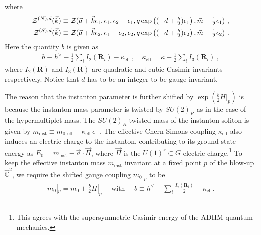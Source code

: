 \documentclass[letterpaper, 11pt]{article}
\def\IC{\mathbb{C}}
\def\IP{\mathbb{P}}
\def\CO{{\cal O}}
\def\CZ{{\cal Z}}
\def\e{\epsilon}
\def\k{\kappa}
\def\half{\frac{1}{2}}
\begin{document}
where
\begin{align}
  \label{eq:param-np-sp5d}
\begin{split}
  \CZ^{(N),d}(\vec{k}) &\equiv \CZ(\vec{a}+\vec{k} \e_1, \e_1, \e_2-\e_1, q \exp \left((-d + \tfrac{b}{2})\e_1 \right), \vec{m} -\tfrac{1}{2}\e_1) \ , \\
  \CZ^{(S),d}(\vec{k}) &\equiv \CZ(\vec{a}+\vec{k} \e_2, \e_1 - \e_2, \e_2, q \exp \left( (-d + \tfrac{b}{2})\e_2\right), \vec{m} -\tfrac{1}{2}\e_2)\ . 
\end{split}
\end{align}
Here the quantity $b$ is given as 
\begin{align}
 b \equiv h^\vee - \frac{1}{2} \sum_i I_2(\mathbf{R}_i) - \kappa_{\textrm{eff}} \ , \quad \kappa_{\textrm{eff}} = \kappa - \half \sum_i I_3(\mathbf{R}_i) \ , 
\end{align}
where $I_2(\mathbf{R})$ and $I_3(\mathbf{R})$ are quadratic and cubic Casimir invariants respectively. 
Notice that $d$ has to be an integer to be gauge-invariant. 

The reason that the instanton parameter is further shifted by $\exp(\frac{b}{2} H|_p) $ is because the instanton mass parameter is twisted by $SU(2)_R$ as in the case of the hypermultiplet mass. The $SU(2)_R$ twisted mass of the instanton soliton is given by $m_\text{inst} \equiv m_{0, \textrm{eff}} - \kappa_\text{eff}\,\e_+$. The  effective Chern-Simons coupling $\k_{\textrm{eff}}$ also induces an electric charge to the instanton, contributing to its ground state energy as $E_0 = m_\text{inst} - \vec{a} \cdot \vec{\Pi}$, where $\vec{\Pi}$ is the $U(1)^r \subset G$ electric charge.\footnote{This agrees with the supersymmetric Casimir energy of the ADHM quantum mechanics.} To keep the effective instanton mass $m_\text{inst}$ invariant at a fixed point $p$ of the blow-up $\hat{\IC}^2$, we require the shifted gauge coupling $m_0|_p$  to be 
\begin{align}
  \label{eq:coupling-shift}
  m_0|_p = m_0 + \frac{b}{2}H|_p \quad \text{ with }\quad
  b \equiv h^{\vee}-\sum_i\frac{I_2(\boldsymbol{R}_i)}{2} - \kappa_\text{eff}.
\end{align}
\end{document}
